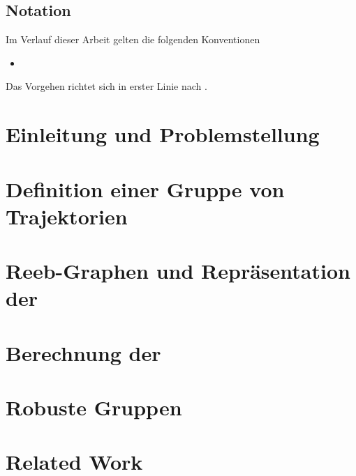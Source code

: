 




\tableofcontents

\section*{Notation}
Im Verlauf dieser Arbeit gelten die folgenden Konventionen
\begin{itemize}
	\item 
\end{itemize}
Das Vorgehen richtet sich in erster Linie nach \textcite{buchin2015}.
\cleardoubleoddemptypage
{}
\setcounter{page}{1}
\setcounter{footnote}{0}

\chapter{Einleitung und Problemstellung} %
\label{cha:einleitung}


\chapter{Definition einer Gruppe von Trajektorien} %
\label{cha:def_gruppe}


\chapter{Reeb-Graphen und Repräsentation der \GrpStruktur} %
\label{cha:reeb_graphen}


\chapter{Berechnung der \GrpStruktur} %
\label{cha:berechnung}


\chapter{Robuste Gruppen} %
\label{cha:robust}


\chapter{Related Work} %
\label{cha:related_work}

